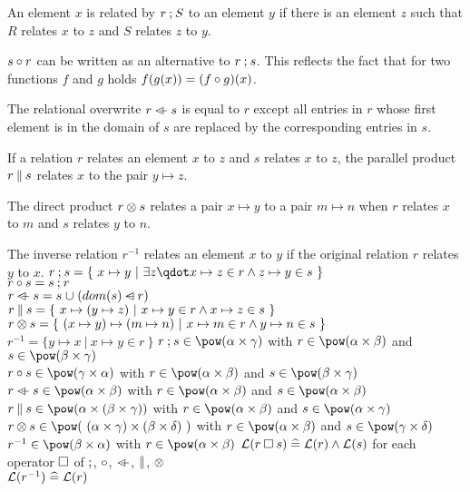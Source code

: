 \begin{rodinrefentry}
  \rrdesc
    An element $x$ is related by $r\mathbin; S$ to an element $y$ if
    there is an element $z$ such that $R$ relates $x$ to $z$ and $S$ relates
    $z$ to $y$.

    $s\circ r$ can be written as an alternative to $r\mathbin; s$.
    This reflects the fact that for two functions $f$ and $g$ holds
    $f(g(x)) = (f\circ g)(x)$.

    The relational overwrite $r\mathbin{\lhd\mkern-9mu-} s$ is equal to $r$ except all entries in $r$
    whose first element is in the domain of $s$ are replaced by the corresponding 
    entries in $s$.
    
    If a relation $r$ relates an element $x$ to $z$ and $s$ relates $x$ to $z$,
    the parallel product $r\mathbin\| s$ relates $x$ to the pair $y\mapsto z$.

    The direct product $r\mathbin\otimes s$ relates a pair $x\mapsto y$ to a pair $m\mapsto n$
    when $r$ relates $x$ to $m$ and $s$ relates $y$ to $n$.

    The inverse relation $r^{-1}$ relates an element $x$ to $y$ if the original relation $r$ 
    relates $y$ to $x$.
  \rrdef
    $r\fcomp s = \{~x \mapsto y~|~\exists z\qdot x \mapsto z \in r \land z \mapsto y \in s~\}$\\
    $r\circ s = s\mathbin; r$\\
    $r\mathbin{\lhd\mkern-9mu-} s = s\mathbin{\mkern1mu\cup\mkern1mu} (dom(s)\mathbin{\lhd\mkern-14mu-} r)$\\
    $r\mathbin\| s = \{~x\mapsto(y\mapsto z)~|~x\mapsto y\in r \land x\mapsto z\in s ~\}$\\
    $r\mathbin\otimes s = \{~(x\mapsto y)\mapsto(m\mapsto n)~|~x\mapsto m\in r \land y\mapsto n\in s ~\}$\\
    $r^{-1} = \{y\mapsto x~|~x\mapsto y\in r~\}$
  \rrtypes
    $r\fcomp s\in\pow(\alpha\cprod\gamma)$ with $r\in\pow(\alpha\cprod\beta)$ and
      $s\in\pow(\beta\cprod\gamma)$\\
    $r\bcomp s\in\pow(\gamma\cprod\alpha)$ with $r\in\pow(\alpha\cprod\beta)$ and
      $s\in\pow(\beta\cprod\gamma)$\\
    $r\ovl s\in\pow(\alpha\cprod\beta)$ with $r\in\pow(\alpha\cprod\beta)$ and
      $s\in\pow(\alpha\cprod\beta)$\\
    $r\pprod s\in\pow(\alpha\cprod(\beta\cprod\gamma))$ with $r\in\pow(\alpha\cprod\beta)$ and
      $s\in\pow(\alpha\cprod\gamma)$\\
    $r\dprod s\in\pow(~(\alpha\cprod\gamma)\cprod(\beta\cprod\delta)~)$ with
      $r\in\pow(\alpha\cprod\beta)$ and
      $s\in\pow(\gamma\cprod\delta)$\\
    $r^{-1}\in\pow(\beta\cprod\alpha)$ with $r\in\pow(\alpha\cprod\beta)$
  \rrwd
    $\mathcal{L}(r\mathbin{\Box} s)\mathrel{\widehat=}\mathcal{L}(r)\land\mathcal{L}(s)$ for each operator $\mathbin{\Box}$ of
    $\mathbin;$, $\circ$, $\mathbin{\lhd\mkern-9mu-}$, $\mathbin\|$, $\mathbin\otimes$\\
    $\mathcal{L}(r^{-1})\mathrel{\widehat=}\mathcal{L}(r)$
\end{rodinrefentry}

